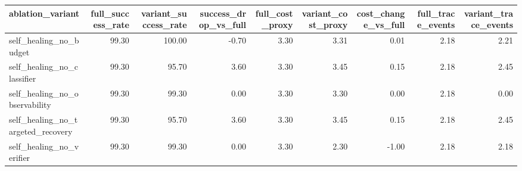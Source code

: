 \begin{tabular}{lrrrrrrrr}
\toprule
ablation_variant & full_success_rate & variant_success_rate & success_drop_vs_full & full_cost_proxy & variant_cost_proxy & cost_change_vs_full & full_trace_events & variant_trace_events \\
\midrule
self_healing_no_budget & 99.30 & 100.00 & -0.70 & 3.30 & 3.31 & 0.01 & 2.18 & 2.21 \\
self_healing_no_classifier & 99.30 & 95.70 & 3.60 & 3.30 & 3.45 & 0.15 & 2.18 & 2.45 \\
self_healing_no_observability & 99.30 & 99.30 & 0.00 & 3.30 & 3.30 & 0.00 & 2.18 & 0.00 \\
self_healing_no_targeted_recovery & 99.30 & 95.70 & 3.60 & 3.30 & 3.45 & 0.15 & 2.18 & 2.45 \\
self_healing_no_verifier & 99.30 & 99.30 & 0.00 & 3.30 & 2.30 & -1.00 & 2.18 & 2.18 \\
\bottomrule
\end{tabular}
